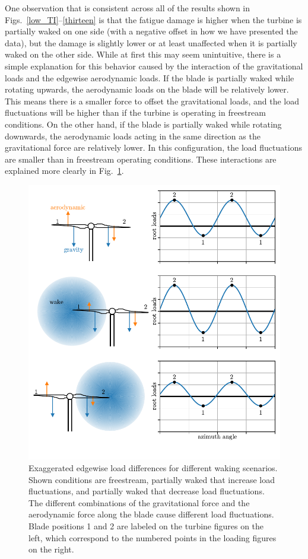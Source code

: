 \documentclass[11pt,letterpaper]{article}
\begin{document}
One observation that is consistent across all of the results shown in Figs.~\ref{low_TI}--\ref{thirteen} is that the fatigue damage is higher when the turbine is partially waked on one side (with a negative offset in how we have presented the data), but the damage is slightly lower or at least unaffected when it is partially waked on the other side. While at first this may seem unintuitive, there is a simple explanation for this behavior caused by the interaction of the gravitational loads and the edgewise aerodynamic loads. If the blade is partially waked while rotating upwards, the aerodynamic loads on the blade will be relatively lower. This means there is a smaller force to offset the gravitational loads, and the load fluctuations will be higher than if the turbine is operating in freestream conditions. On the other hand, if the blade is partially waked while rotating downwards, the aerodynamic loads acting in the same direction as the gravitational force are relatively lower. In this configuration, the load fluctuations are smaller than in freestream operating conditions. These interactions are explained more clearly in Fig.~\ref{partial_loading}.
% 
\begin{figure}
    \centering
    \includegraphics{images/partial_loading.pdf}
    \caption{Exaggerated edgewise load differences for different waking scenarios. Shown conditions are freestream, partially waked that increase load fluctuations, and partially waked that decrease load fluctuations. The different combinations of the gravitational force and the aerodynamic force along the blade cause different load fluctuations. Blade positions 1 and 2 are labeled on the turbine figures on the left, which correspond to the numbered points in the loading figures on the right. }
    \label{partial_loading}
\end{figure}
\end{document}
